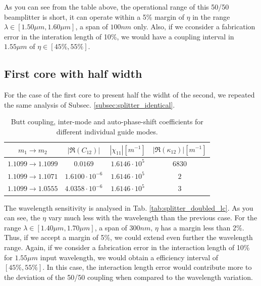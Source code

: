 \documentclass[conference, a4paper]{IEEEtran}
\begin{document}
As you can see from the table above, the operational range of this 50/50 beamplitter is short, it can operate within a 5\% margin of $\eta$ in the range $\lambda \in [1.50\mu m, 1.60\mu m]$, a span of $100nm$ only. Also, if we cconsider a fabrication error in the interation length of 10\%, we would have a coupling interval in $1.55 \mu m$ of $\eta \in [45\%, 55\%]$.  

\subsection{First core with half width}
\label{subsec:splitter_doubled}

For the case of the first core to present half the widht of the second, we repeated the same analysis of Subsec. \ref{subsec:splitter_identical}. 

\begin{table}[H]
    \centering
    \begin{tabular}{cccc}
        \toprule
        $m_1 \rightarrow m_2$ & $|\Re(C_{12})|$ & $|\chi_{11}| [m^{-1}]$ & $|\Re(\kappa_{12})| [m^{-1}]$ \\ 
        \midrule
        $1.1099 \rightarrow 1.1099$ & $0.0169$ & $1.6146 \cdot 10^5 $ & $6830$ \\
        $1.1099 \rightarrow 1.1071$ & $1.6100 \cdot 10^{-6}$ & $1.6146 \cdot 10^5 $ & $2$ \\
        $1.1099 \rightarrow 1.0555$ & $4.0358 \cdot 10^{-6}$ & $1.6146 \cdot 10^5 $ & $3$ \\
        \bottomrule
    \end{tabular}
    \caption{Butt coupling, inter-mode and auto-phase-shift coefficients for different individual guide modes.}
    \label{tab:splitter_identical_coefficients}
\end{table}

The wavelength sensitivity is analysed in Tab. \ref{tab:splitter_doubled_lc}. As you can see, the $\eta$ vary much less with the wavelength than the previous case. For the range $\lambda \in [1.40 \mu m, 1.70 \mu m]$, a span of $300nm$, $\eta$ has a margin less than 2\%. Thus, if we accept a margin of 5\%, we could extend even further the wavelength range. Again, if we consider a fabrication error in the interaction length of 10\% for $1.55\mu m$ input wavelength, we would obtain a efficiency interval of $[45\%, 55\%]$. In this case, the interaction length error would contribute more to the deviation of the 50/50 coupling when compared to the wavelength variation.
\end{document}
